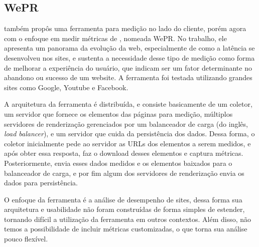 \documentclass[12pt]{tcc}
\begin{document}
		\subsection{WePR}
		\par \citep{Asrese2019MeasuringWL} também propôs uma ferramenta para medição no lado do cliente, porém agora com o enfoque em medir métricas de , nomeada WePR. No trabalho, ele apresenta um panorama da evolução da web, especialmente de como a latência se desenvolveu nos sites, e sustenta a necessidade desse tipo de medição como forma de melhorar a experiência do usuário, que indicam ser um fator determinante no abandono ou sucesso de um website. A ferramenta foi testada utilizando grandes sites como Google, Youtube e Facebook. 
		\par A arquitetura da ferramenta é distribuída, e consiste basicamente de um coletor, um servidor que fornece os elementos das páginas para medição, múltiplos servidores de renderização gerenciados por um balanceador de carga (do inglês, \emph{load balancer}), e um servidor que cuida da persistência dos dados. Dessa forma, o coletor inicialmente pede ao servidor as URLs dos elementos a serem medidos, e após obter essa resposta, faz o download desses elementos e captura métricas. Posteriormente, envia esses dados medidos e os elementos baixados para o balanceador de carga, e por fim algum dos servidores de renderização envia os dados para persistência.
		\par O enfoque da ferramenta é a análise de desempenho de sites, dessa forma sua arquitetura e usabilidade não foram construídas de forma simples de estender, tornando difícil a utilização da ferramenta em outros contextos. Além disso, não temos a possibilidade de incluir métricas customizadas, o que torna sua análise pouco flexível.
		
\end{document}
